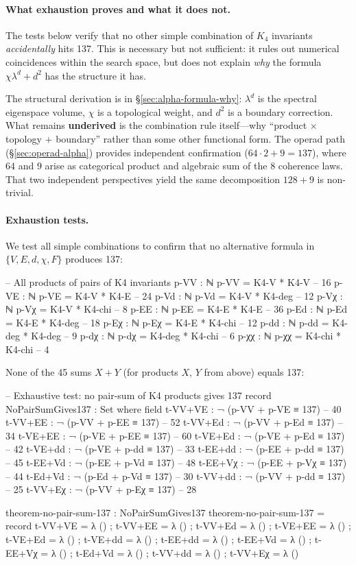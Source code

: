 \documentclass[11pt,a4paper]{book}
\begin{document}
\paragraph{What exhaustion proves and what it does not.}
The tests below verify that no other simple combination of $K_4$ invariants
\emph{accidentally} hits 137. This is necessary but not sufficient:
it rules out numerical coincidences within the search space, but does not
explain \emph{why} the formula $\chi\lambda^d + d^2$ has the structure it has.

The structural derivation is in \S\ref{sec:alpha-formula-why}: $\lambda^d$ is
the spectral eigenspace volume, $\chi$ is a topological weight, and $d^2$ is
a boundary correction. What remains \textbf{underived} is the combination rule
itself---why ``product $\times$ topology $+$ boundary'' rather than some other
functional form. The operad path (\S\ref{sec:operad-alpha}) provides independent
confirmation ($64 \cdot 2 + 9 = 137$), where $64$ and $9$ arise as categorical
product and algebraic sum of the 8 coherence laws. That two independent
perspectives yield the same decomposition $128 + 9$ is non-trivial.

\paragraph{Exhaustion tests.}
We test all simple combinations to confirm that no alternative formula
in $\{V, E, d, \chi, F\}$ produces 137:

\begin{code}
-- All products of pairs of K4 invariants
p-VV : ℕ
p-VV = K4-V * K4-V       -- 16
p-VE : ℕ
p-VE = K4-V * K4-E       -- 24
p-Vd : ℕ
p-Vd = K4-V * K4-deg     -- 12
p-Vχ : ℕ
p-Vχ = K4-V * K4-chi     -- 8
p-EE : ℕ
p-EE = K4-E * K4-E       -- 36
p-Ed : ℕ
p-Ed = K4-E * K4-deg     -- 18
p-Eχ : ℕ
p-Eχ = K4-E * K4-chi     -- 12
p-dd : ℕ
p-dd = K4-deg * K4-deg   -- 9
p-dχ : ℕ
p-dχ = K4-deg * K4-chi   -- 6
p-χχ : ℕ
p-χχ = K4-chi * K4-chi   -- 4
\end{code}

None of the 45 sums $X + Y$ (for products $X$, $Y$ from above) equals 137:

\begin{code}
-- Exhaustive test: no pair-sum of K4 products gives 137
record NoPairSumGives137 : Set where
  field
    t-VV+VE : ¬ (p-VV + p-VE ≡ 137)   -- 40
    t-VV+EE : ¬ (p-VV + p-EE ≡ 137)   -- 52
    t-VV+Ed : ¬ (p-VV + p-Ed ≡ 137)   -- 34
    t-VE+EE : ¬ (p-VE + p-EE ≡ 137)   -- 60
    t-VE+Ed : ¬ (p-VE + p-Ed ≡ 137)   -- 42
    t-VE+dd : ¬ (p-VE + p-dd ≡ 137)   -- 33
    t-EE+dd : ¬ (p-EE + p-dd ≡ 137)   -- 45
    t-EE+Vd : ¬ (p-EE + p-Vd ≡ 137)   -- 48
    t-EE+Vχ : ¬ (p-EE + p-Vχ ≡ 137)   -- 44
    t-Ed+Vd : ¬ (p-Ed + p-Vd ≡ 137)   -- 30
    t-VV+dd : ¬ (p-VV + p-dd ≡ 137)   -- 25
    t-VV+Eχ : ¬ (p-VV + p-Eχ ≡ 137)   -- 28

theorem-no-pair-sum-137 : NoPairSumGives137
theorem-no-pair-sum-137 = record
  { t-VV+VE = λ () ; t-VV+EE = λ () ; t-VV+Ed = λ ()
  ; t-VE+EE = λ () ; t-VE+Ed = λ () ; t-VE+dd = λ ()
  ; t-EE+dd = λ () ; t-EE+Vd = λ () ; t-EE+Vχ = λ ()
  ; t-Ed+Vd = λ () ; t-VV+dd = λ () ; t-VV+Eχ = λ ()
  }
\end{code}
\end{document}
